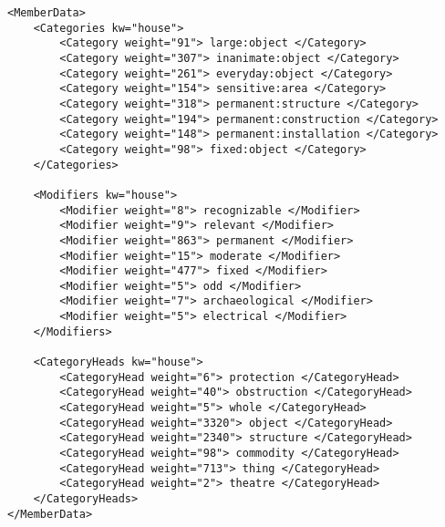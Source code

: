 \lstset{language=XML}
\begin{lstlisting}[caption= Ejemplo formatos XML Thesaurus Rex para la palabra \textit{house}, label={lst:xmlthesaurusrex}, frame=single]
<MemberData>
	<Categories kw="house">
		<Category weight="91"> large:object </Category>
		<Category weight="307"> inanimate:object </Category>
		<Category weight="261"> everyday:object </Category>
		<Category weight="154"> sensitive:area </Category>
		<Category weight="318"> permanent:structure </Category>
		<Category weight="194"> permanent:construction </Category>
		<Category weight="148"> permanent:installation </Category>
		<Category weight="98"> fixed:object </Category>
	</Categories>
	
	<Modifiers kw="house">
		<Modifier weight="8"> recognizable </Modifier>
		<Modifier weight="9"> relevant </Modifier>
		<Modifier weight="863"> permanent </Modifier>
		<Modifier weight="15"> moderate </Modifier>
		<Modifier weight="477"> fixed </Modifier>
		<Modifier weight="5"> odd </Modifier>
		<Modifier weight="7"> archaeological </Modifier>
		<Modifier weight="5"> electrical </Modifier>
	</Modifiers>
	
	<CategoryHeads kw="house">
		<CategoryHead weight="6"> protection </CategoryHead>
		<CategoryHead weight="40"> obstruction </CategoryHead>
		<CategoryHead weight="5"> whole </CategoryHead>
		<CategoryHead weight="3320"> object </CategoryHead>
		<CategoryHead weight="2340"> structure </CategoryHead>
		<CategoryHead weight="98"> commodity </CategoryHead>
		<CategoryHead weight="713"> thing </CategoryHead>
		<CategoryHead weight="2"> theatre </CategoryHead>
	</CategoryHeads>
</MemberData>

\end{lstlisting}



